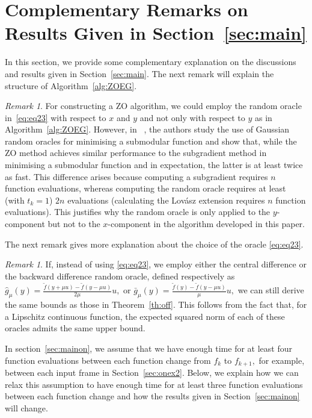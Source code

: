 \documentclass{article}
\theoremstyle{plain}
\theoremstyle{definition}
\theoremstyle{remark}
\newtheorem{remark}[theorem]{Remark}
\begin{document}
\section{Complementary Remarks on Results Given in Section~\ref{sec:main}}\label{app:rem}
In this section, we provide some complementary explanation on the discussions and results given in Section~\ref{sec:main}. The next remark will explain the structure of Algorithm~\ref{alg:ZOEG}.
\begin{remark}
For constructing a ZO algorithm, we could 
employ the random oracle in~\eqref{eq:eq23} with respect to $x$ and $y$ and not only with respect to $y$ as in Algorithm~\ref{alg:ZOEG}.
However, in
~\cite{farzin2025minimisationsubmodular}, the authors study the use of Gaussian random oracles for minimising a submodular function and show that, while the ZO method achieves similar performance to the subgradient method in minimising a submodular function and in expectation, the latter is at least twice as fast. This difference arises because computing a subgradient requires $n$ function evaluations, whereas computing the random oracle requires at least (with $t_k=1$) $2n$ evaluations (calculating the Lovász extension requires $n$ function evaluations). 
This justifies why the random oracle is only applied to the $y$-component but not to the $x$-component in the algorithm developed in this paper.
\end{remark}
The next remark gives more explanation about the choice of the oracle \eqref{eq:eq23}.
 \begin{remark}
   If, instead of using \eqref{eq:eq23}, we employ either the central difference or the backward difference random oracle, defined respectively as
\(
\hat{g}_\mu(y) = \frac{\tilde{f}(y+\mu u) - \tilde{f}(y-\mu u)}{2\mu}u,\) or \( 
\bar{g}_\mu(y) = \frac{\tilde{f}(y) - \tilde{f}(y-\mu u)}{\mu}u,
\)
we can still derive the same bounds as those in Theorem~\ref{th:off}. This follows from the fact that, for a Lipschitz continuous function, the expected squared norm of each of these oracles admits the same upper bound.
 \end{remark}
 

In section~\ref{sec:mainon}, we assume that we have enough time for at least four function evaluations between each function change from $f_k$ to $f_{k+1},$ for example, between each input frame in Section~\ref{sec:onex2}. Below, we explain how we can relax this assumption to have enough time for at least three function evaluations between each function change and how the results given in Section~\ref{sec:mainon} will change.
\end{document}
